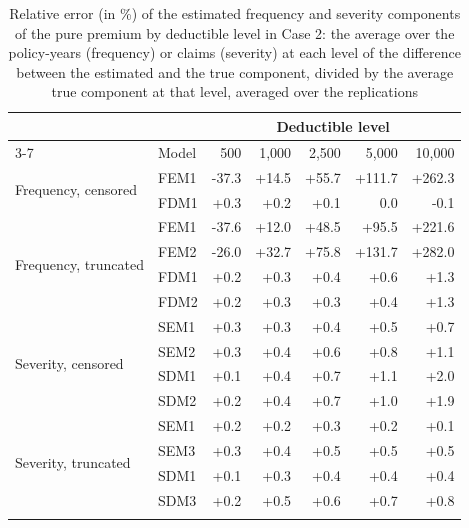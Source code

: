\documentclass[11pt]{article}
\begin{document}
\begin{table}[!ht]
\footnotesize
\centering
{\color{blue}
\begin{tabular}{llrrrrr}
\toprule
 & & \multicolumn{5}{c}{Deductible level} \\
\cmidrule(lr){3-7}
 & Model &    500 &  1,000 &  2,500 &  5,000 & 10,000 \\
\midrule
\multirow{2}{*}{Frequency, censored} & FEM1 & -37.3 & +14.5 & +55.7 & +111.7 & +262.3 \\
 & FDM1 & +0.3 & +0.2 & +0.1 & 0.0 & -0.1 \\
\midrule
\multirow{4}{*}{Frequency, truncated} & FEM1 & -37.6 & +12.0 & +48.5 & +95.5 & +221.6 \\
 & FEM2 & -26.0 & +32.7 & +75.8 & +131.7 & +282.0 \\
 & FDM1 & +0.2 & +0.3 & +0.4 & +0.6 & +1.3 \\
 & FDM2 & +0.2 & +0.3 & +0.3 & +0.4 & +1.3 \\
\midrule
\multirow{4}{*}{Severity, censored} & SEM1 & +0.3 & +0.3 & +0.4 & +0.5 & +0.7 \\
 & SEM2 & +0.3 & +0.4 & +0.6 & +0.8 & +1.1 \\
 & SDM1 & +0.1 & +0.4 & +0.7 & +1.1 & +2.0 \\
 & SDM2 & +0.2 & +0.4 & +0.7 & +1.0 & +1.9 \\
\midrule
\multirow{4}{*}{Severity, truncated} & SEM1 & +0.2 & +0.2 & +0.3 & +0.2 & +0.1 \\
 & SEM3 & +0.3 & +0.4 & +0.5 & +0.5 & +0.5 \\
 & SDM1 & +0.1 & +0.3 & +0.4 & +0.4 & +0.4 \\
 & SDM3 & +0.2 & +0.5 & +0.6 & +0.7 & +0.8 \\
\hhline{=======}
\end{tabular}
}
\caption{Relative error (in \%) of the estimated frequency and severity components of the pure premium by deductible level in Case 2: the average over the policy-years (frequency) or claims (severity) at each level of the difference between the estimated and the true component, divided by the average true component at that level, averaged over the replications}\label{tab:bylevel2}
\end{table}
\end{document}
